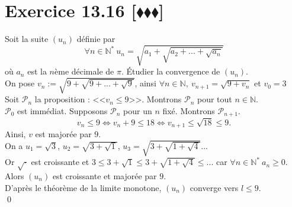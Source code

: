 \documentclass[10pt]{article}
\begin{document}
\section*{Exercice 13.16 [$\blacklozenge\blacklozenge\blacklozenge$]}
\begin{tcolorbox}[enhanced, width=7.6in, center, size=fbox, fontupper=\large, drop shadow southwest]
    Soit la suite $(u_n)$ définie par
    \begin{equation*}
        \forall n\in\mathbb{N}^* ~ u_n = \sqrt{a_1 + \sqrt{a_2 + ... + \sqrt{a_n}}}
    \end{equation*}
    où $a_n$ est la $n$ème décimale de $\pi$. Étudier la convergence de $(u_n)$.\\
    On pose $v_n := \sqrt{9 + \sqrt{9 + ... + \sqrt{9}}}$, ainsi $\forall{n\in\mathbb{N}},~v_{n+1} = \sqrt{9 + v_n}$ et $v_0 = 3$\\
    Soit $\mathcal{P}_n$ la proposition : <<$v_n \leq 9$>>. Montrons $\mathcal{P}_n$ pour tout $n\in\mathbb{N}$.\\
    $\mathcal{P}_0$ est immédiat. Supposons $\mathcal{P}_n$ pour un $n$ fixé. Montrons $\mathcal{P}_{n+1}$.
    \begin{equation*}
        v_n \leq 9 \iff v_n + 9 \leq 18 \iff v_{n+1} \leq \sqrt{18} \leq 9.
    \end{equation*}
    Ainsi, $v$ est majorée par $9$.\\
    On a $u_1 = \sqrt{3}$, $u_2 = \sqrt{3 + \sqrt{1}}$, $u_3 = \sqrt{3 + \sqrt{1 + \sqrt{4}}}...$\\
    Or $\sqrt{\cdot}$ est croissante et $3 \leq 3 + \sqrt{1} \leq 3 + \sqrt{1 + \sqrt{4}} \leq ...$ car $\forall{n\in\mathbb{N}^*} ~ a_n \geq 0$.\\
    Alors $(u_n)$ est croissante et majorée par $9$.\\
    D'après le théorème de la limite monotone, $(u_n)$ converge vers $l\leq9$.\\
    \qed 
\end{tcolorbox}
\end{document}
